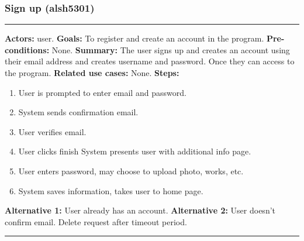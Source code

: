 \documentclass[11pt]{report}
\begin{document}
\subsubsection{Sign up (alsh5301)}
\vspace{2pt}
\hrule
\vspace{8pt}
 \textbf{Actors:} user. \newline
\textbf{Goals:} To register and create an account in the program. \newline
 \textbf{Pre-conditions:} None. \newline
 \textbf{Summary:} The user signs up and creates an account using their email address and creates username and password. Once they can access to the program. \newline
\textbf{Related use cases:} None. \newline
\textbf{Steps:} \begin{enumerate}
  \item User is prompted to enter email and password.
  \item System sends confirmation email.
  \item User verifies email.
  \item User clicks finish System presents user with additional info page.
  \item User enters password, may choose to upload photo, works, etc.
  \item System saves information, takes user to home page.
 \end{enumerate}
 \textbf{Alternative 1:} User already has an account. \newline
\textbf{Alternative 2:} User doesn't confirm email. Delete request after timeout period. \newline
\vspace{8pt}
\hrule
\newpage
\end{document}
